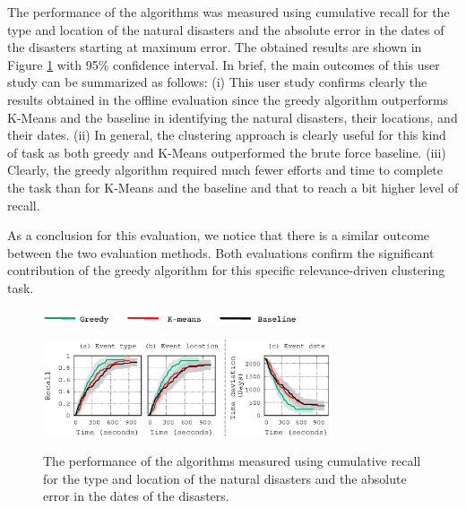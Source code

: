 The performance of the algorithms was measured using cumulative recall for the type and location of the natural disasters and the absolute error in the dates of the disasters starting at maximum error. The obtained results are shown in Figure \ref{fig:UserSurveyRecall} with 95\% confidence interval.
In brief, the main outcomes of this user study can be summarized as follows: 
(i) This user study confirms clearly the results obtained in the offline evaluation since the greedy algorithm outperforms K-Means and the baseline in identifying the natural disasters, their locations, and their dates.
(ii) In general, the clustering approach is clearly useful for this kind of task as both greedy and K-Means outperformed the  brute force baseline. 
(iii) Clearly, the greedy algorithm required much fewer efforts and time to complete the task than for K-Means and the baseline and that to reach a bit higher level of recall. 

 As a conclusion for this evaluation, we notice that there is a similar outcome between the two evaluation methods. Both evaluations confirm the significant contribution of the greedy algorithm for this specific relevance-driven clustering task. %




\begin{figure}[t]
\begin{centering}
\includegraphics[width=7.5cm]{imgs/legend9}
\par\end{centering}
\begin{centering}
{\includegraphics[width=8.5cm]{imgs/nd_recall}}
\par\end{centering}
\caption{The performance of the algorithms measured using cumulative recall for the type and location of the natural disasters and the absolute error in the dates of the disasters.}
\label{fig:UserSurveyRecall}
\end{figure}







